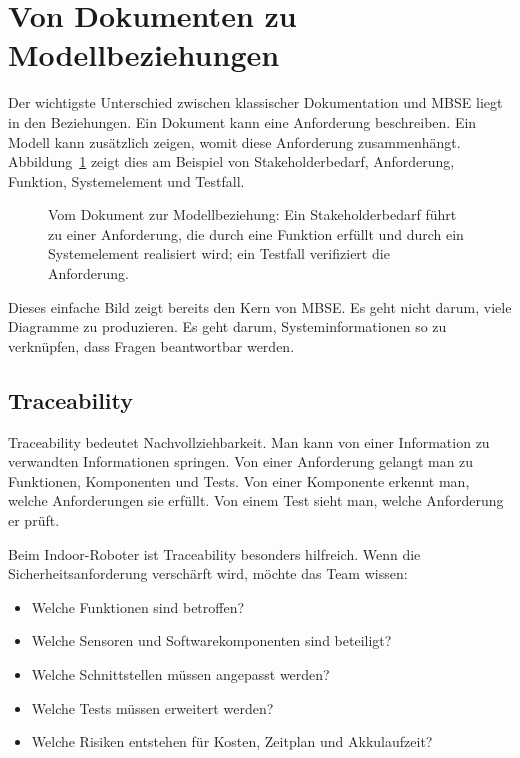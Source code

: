 \section{Von Dokumenten zu Modellbeziehungen}
Der wichtigste Unterschied zwischen klassischer Dokumentation und MBSE liegt in den Beziehungen. Ein Dokument kann eine Anforderung beschreiben. Ein Modell kann zusätzlich zeigen, womit diese Anforderung zusammenhängt. Abbildung~\ref{fig:kap02-dokumente-modellbeziehungen} zeigt dies am Beispiel von Stakeholderbedarf, Anforderung, Funktion, Systemelement und Testfall.

\begin{figure}[H]
  \centering
  \caption{Vom Dokument zur Modellbeziehung: Ein Stakeholderbedarf führt zu einer Anforderung, die durch eine Funktion erfüllt und durch ein Systemelement realisiert wird; ein Testfall verifiziert die Anforderung.}
  \label{fig:kap02-dokumente-modellbeziehungen}
\end{figure}

Dieses einfache Bild zeigt bereits den Kern von MBSE. Es geht nicht darum, viele Diagramme zu produzieren. Es geht darum, Systeminformationen so zu verknüpfen, dass Fragen beantwortbar werden.

\subsection{Traceability}
Traceability bedeutet Nachvollziehbarkeit. Man kann von einer Information zu verwandten Informationen springen. Von einer Anforderung gelangt man zu Funktionen, Komponenten und Tests. Von einer Komponente erkennt man, welche Anforderungen sie erfüllt. Von einem Test sieht man, welche Anforderung er prüft.

Beim Indoor-Roboter ist Traceability besonders hilfreich. Wenn die Sicherheitsanforderung verschärft wird, möchte das Team wissen:

\begin{itemize}
    \item Welche Funktionen sind betroffen?
    \item Welche Sensoren und Softwarekomponenten sind beteiligt?
    \item Welche Schnittstellen müssen angepasst werden?
    \item Welche Tests müssen erweitert werden?
    \item Welche Risiken entstehen für Kosten, Zeitplan und Akkulaufzeit?
\end{itemize}

